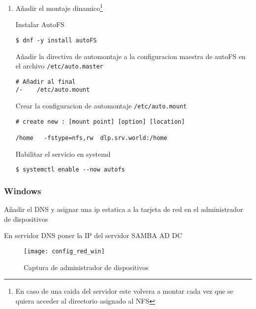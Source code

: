 \documentclass[../main.tex]{subfiles}
\begin{document}
\begin{enumerate}
  \item Añadir el montaje dinamico\footnote{En caso de una caida
        del servidor este volvera a montar cada vez que se
        quiera acceder al directorio asignado al NFS}

        Instalar AutoFS

        \begin{listing}[H]
\begin{verbatim}
$ dnf -y install autoFS
\end{verbatim}
\end{listing}
        Añadir la directiva de automontaje a la configuracion maestra de autoFS en el archivo \texttt{/etc/auto.master}

        \begin{listing}[H]
\begin{verbatim}
# Añadir al final
/-    /etc/auto.mount
\end{verbatim}
\end{listing}

        Crear la configuracion de automontaje \texttt{/etc/auto.mount}

        \begin{listing}[H]
\begin{verbatim}
# create new : [mount point] [option] [location]

/home   -fstype=nfs,rw  dlp.srv.world:/home
\end{verbatim}
\end{listing}

        Habilitar el servicio en systemd
        \begin{listing}[H]
\begin{verbatim}
$ systemctl enable --now autofs
\end{verbatim}
\end{listing}

\end{enumerate}


\newpage{}



\subsubsection{Windows}\label{sec:cliente_win}

\item Añadir el DNS y asignar una ip estatica a la tarjeta de red en el administrador de dispositivos
\item En servidor DNS poner la IP del servidor SAMBA AD DC
\begin{figure}[H]
  \centering
  \texttt{[image: config\_red\_win]}
  \caption{Captura de administrador de dispositivos}\label{fig:confrwin}
\end{figure}
\end{document}
